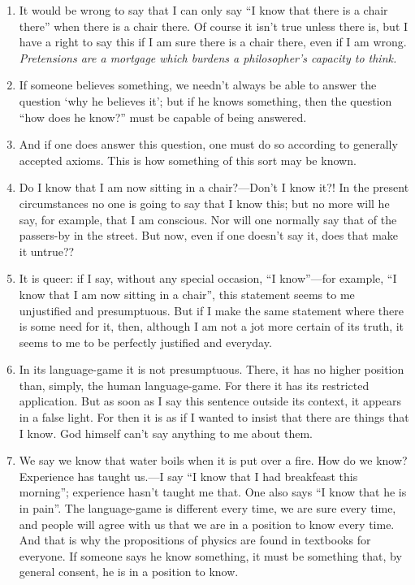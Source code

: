 \documentclass{book}
\begin{document}
\begin{enumerate}
\item
It would be wrong to say that I can only say ``I know that there is a chair
there'' when there is a chair there. Of course it isn't true unless there is,
but I have a right to say this if I am sure there is a chair there, even if I
am wrong.
\\
\emph{Pretensions are a mortgage which burdens a philosopher's capacity to
think.}

\item
If someone believes something, we needn't always be able to answer the question
`why he believes it'; but if he knows something, then the question ``how does
he know?'' must be capable of being answered.

\item
And if one does answer this question, one must do so according to generally
accepted axioms. This is how something of this sort may be known.

\item
Do I know that I am now sitting in a chair?---Don't I know it?! In the present
circumstances no one is going to say that I know this; but no more will he say,
for example, that I am conscious. Nor will one normally say that of the
passers-by in the street.  But now, even if one doesn't say it, does that make
it untrue??

\item
It is queer: if I say, without any special occasion, ``I know''---for example,
``I know that I am now sitting in a chair'', this statement seems to me
unjustified and presumptuous. But if I make the same statement where there is
some need for it, then, although I am not a jot more certain of its truth, it
seems to me to be perfectly justified and everyday.

\item
In its language-game it is not presumptuous. There, it has no higher position
than, simply, the human language-game. For there it has its restricted
application.  But as soon as I say this sentence outside its context, it
appears in a false light. For then it is as if I wanted to insist that there
are things that I know. God himself can't say anything to me about them.

\item
We say we know that water boils when it is put over a fire. How do we know?
Experience has taught us.---I say ``I know that I had breakfeast this
morning''; experience hasn't taught me that. One also says ``I know that he is
in pain''. The language-game is different every time, we are sure every time,
and people will agree with us that we are in a position to know every time. And
that is why the propositions of physics are found in textbooks for everyone.
If someone says he know something, it must be something that, by general
consent, he is in a position to know.


\end{enumerate}
\end{document}
